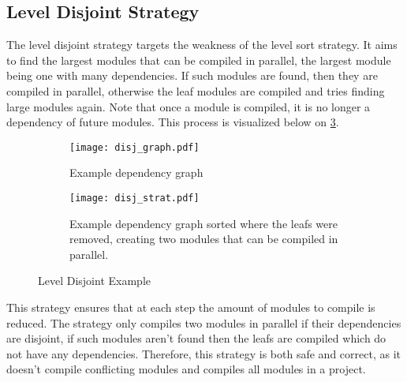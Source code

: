 

\pagebreak
\subsection{Level Disjoint Strategy} \label{sub:design disjoint strategy}

The level disjoint strategy targets the weakness of the level sort strategy. It
aims to find the largest modules that can be compiled in parallel, the largest
module being one with many dependencies. If such modules are found, then they
are compiled in parallel, otherwise the leaf modules are compiled and tries
finding large modules again. Note that once a module is compiled, it is no
longer a dependency of future modules. This process is visualized below on
\cref{subfig:disj strat}.
\begin{figure}[H]
  \begin{subfigure}[t]{0.5\textwidth}
    \centering
    \texttt{[image: disj\_graph.pdf]}
    \caption{Example dependency graph}
    \label{fig:example disj dep graph}
  \end{subfigure} \hfill
  \begin{subfigure}[t]{0.40\textwidth}
    \centering
    \texttt{[image: disj\_strat.pdf]}
    \caption{Example dependency graph sorted where the leafs were removed,
    creating two modules that can be compiled in parallel. }
    \label{fig:example disj strat}
  \end{subfigure}
  \caption{Level Disjoint Example}
  \label{subfig:disj strat}
\end{figure}

This strategy ensures that at each step the amount of modules to compile is
reduced. The strategy only compiles two modules in parallel if their
dependencies are disjoint, if such modules aren't found then the leafs are
compiled which do not have any dependencies. Therefore, this strategy is both
safe and correct, as it doesn't compile conflicting modules and compiles all
modules in a project.

